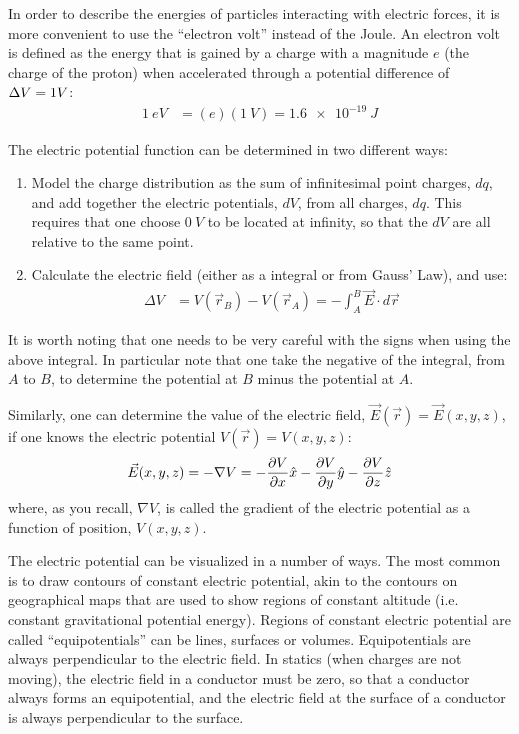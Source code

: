\begin{chapterSummary}
In order to describe the energies of particles interacting with electric forces, it is more convenient to use the ``electron volt'' instead of the Joule. An electron volt is defined as the energy that is gained by a charge with a magnitude $e$ (the charge of the proton) when accelerated through a potential difference of $\Delta V=\SI1{}{V}$:
\begin{align*}
\SI{1}{eV}&=(e)(\SI{1}{V})=\SI{1.6e-19}{J}
\end{align*}

The electric potential function can be determined in two different ways:
\begin{enumerate}
\item Model the charge distribution as the sum of infinitesimal point charges, $dq$, and add together the electric potentials, $dV$, from all charges, $dq$. This requires that one choose $\SI{0}{V}$ to be located at infinity, so that the $dV$ are all relative to the same point.
\item Calculate the electric field (either as a integral or from Gauss' Law), and use:
\begin{align*}
\Delta V &=V(\vec r_B)-V(\vec r_A)=-\int_A^B  \vec E\cdot d\vec r
\end{align*}
\end{enumerate}
It is worth noting that one needs to be very careful with the signs when using the above integral. In particular note that one take the negative of the integral, from $A$ to $B$, to determine the potential at $B$ minus the potential at $A$. 

Similarly, one can determine the value of the electric field, $\vec E(\vec r)=\vec E(x,y,z)$, if one knows the electric potential $V(\vec r)=V(x,y,z)$:
\begin{align*}
\vec E(x,y,z) = -\nabla V =-\frac{\partial V}{\partial x}\hat x-\frac{\partial V}{\partial y}\hat y-\frac{\partial V}{\partial z}\hat z
\end{align*}
where, as you recall, $\nabla V$, is called the gradient of the electric potential as a function of position, $V(x,y,z)$. 

The electric potential can be visualized in a number of ways. The most common is to draw contours of constant electric potential, akin to the contours on geographical maps that are used to show regions of constant altitude (i.e. constant gravitational potential energy). Regions of constant electric potential are called ``equipotentials'' can be lines, surfaces or volumes. Equipotentials are always perpendicular to the electric field. In statics (when charges are not moving), the electric field in a conductor must be zero, so that a conductor always forms an equipotential, and the electric field at the surface of a conductor is always perpendicular to the surface.


\end{chapterSummary}
